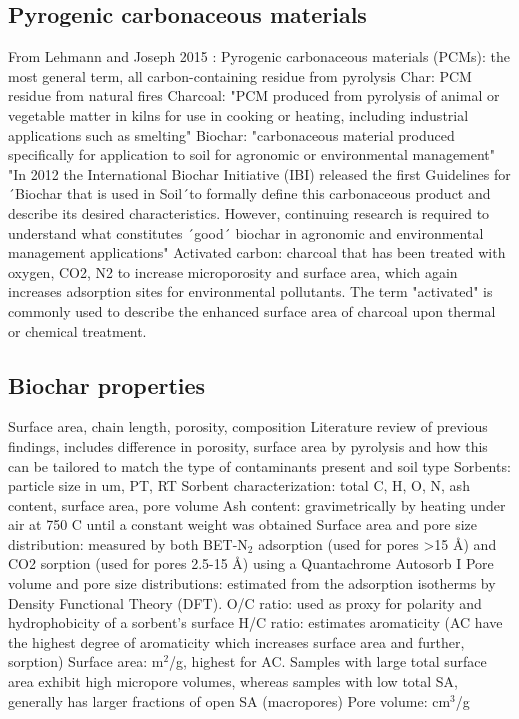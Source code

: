 \subsection{Pyrogenic carbonaceous materials}
From Lehmann and Joseph 2015 \citep{LehmannAndJoseph2015}:
Pyrogenic carbonaceous materials (PCMs): the most general term, all carbon-containing residue from pyrolysis
Char: PCM residue from natural fires
Charcoal: "PCM produced from pyrolysis of animal or vegetable matter in kilns for use in cooking or heating, including industrial applications such as smelting"
Biochar: "carbonaceous material produced specifically for application to soil for agronomic or environmental management" "In 2012 the International Biochar Initiative (IBI) released the first Guidelines for ´Biochar that is used in Soil´to formally define this carbonaceous product and describe its desired characteristics. However, continuing research is required to understand what constitutes ´good´ biochar in agronomic and environmental management applications"
Activated carbon: charcoal that has been treated with oxygen, CO2, N2 to increase microporosity and surface area, which again increases adsorption sites for environmental pollutants. The term "activated" is commonly used to describe the enhanced surface area of charcoal upon thermal or chemical treatment.

\subsection{Biochar properties}
Surface area, chain length, porosity, composition
Literature review of previous findings, includes difference in porosity, surface area by pyrolysis and how this can be tailored to match the type of contaminants present and soil type
Sorbents: particle size in um, PT, RT
Sorbent characterization: total C, H, O, N, ash content, surface area, pore volume
Ash content: gravimetrically by heating under air at 750 \textdegree C until a constant weight was obtained
Surface area and pore size distribution: measured by both BET-N$_2$ adsorption (used for pores >15 Å) and CO2 sorption (used for pores 2.5-15 Å) using a Quantachrome Autosorb I
Pore volume and pore size distributions: estimated from the adsorption isotherms by Density Functional Theory (DFT).
O/C ratio: used as proxy for polarity and hydrophobicity of a sorbent's surface
H/C ratio: estimates aromaticity (AC have the highest degree of aromaticity which increases surface area and further, sorption)
Surface area: m$^2$/g, highest for AC. Samples with large total surface area exhibit high micropore volumes, whereas samples with low total SA, generally has larger fractions of open SA (macropores)
Pore volume: cm$^3$/g

